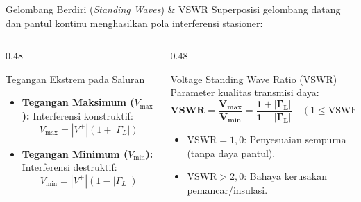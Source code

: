 \documentclass[aspectratio=169,10pt]{beamer}
\begin{document}
\begin{frame}{Gelombang Berdiri (\textit{Standing Waves}) \& VSWR}
  Superposisi gelombang datang dan pantul kontinu menghasilkan pola interferensi stasioner:
  \begin{columns}[t]
    \begin{column}{0.48\textwidth}
      \begin{block}{Tegangan Ekstrem pada Saluran}
        \small
        \begin{itemize}
          \item \textbf{Tegangan Maksimum ($V_{\text{max}}$):} Interferensi konstruktif:
          \begin{equation*}
            V_{\text{max}} = |V^+| (1 + |\Gamma_L|)
          \end{equation*}
          \item \textbf{Tegangan Minimum ($V_{\text{min}}$):} Interferensi destruktif:
          \begin{equation*}
            V_{\text{min}} = |V^+| (1 - |\Gamma_L|)
          \end{equation*}
        \end{itemize}
      \end{block}
    \end{column}
    \begin{column}{0.48\textwidth}
      \begin{alertblock}{Voltage Standing Wave Ratio (VSWR)}
        \small
        Parameter kualitas transmisi daya:
        \begin{equation*}
          \mathbf{\text{VSWR} = \frac{V_{\text{max}}}{V_{\text{min}}} = \frac{1 + |\Gamma_L|}{1 - |\Gamma_L|}} \quad (1 \le \text{VSWR} < \infty)
        \end{equation*}
        \begin{itemize}
          \item $\text{VSWR} = 1{,}0$: Penyesuaian sempurna (tanpa daya pantul).
          \item $\text{VSWR} > 2{,}0$: Bahaya kerusakan pemancar/insulasi.
        \end{itemize}
      \end{alertblock}
    \end{column}
  \end{columns}
\end{frame}
\end{document}
